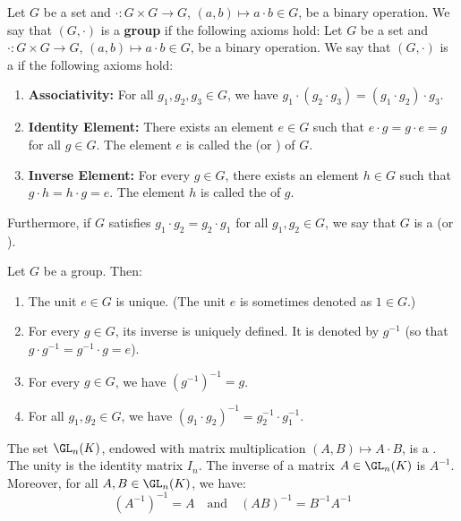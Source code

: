 \begin{definition}[Group]
Let $G$ be a set and $\cdot : G \times G \to G$, $(a,b) \mapsto a \cdot b \in G$, be a binary operation. We say that $(G, \cdot)$ is a \textbf{group} if the following axioms hold:
Let $G$ be a set and $\cdot : G \times G \to G$, $(a,b) \mapsto a \cdot b \in G$, be a binary operation. We say that $(G, \cdot)$ is a  if the following axioms hold:
\begin{enumerate}
    \item \textbf{Associativity:} For all $g_1, g_2, g_3 \in G$, we have $g_1 \cdot (g_2 \cdot g_3) = (g_1 \cdot g_2) \cdot g_3$.
    \item \textbf{Identity Element:} There exists an element $e \in G$ such that $e \cdot g = g \cdot e = g$ for all $g \in G$. The element $e$ is called the  (or ) of $G$.
    \item \textbf{Inverse Element:} For every $g \in G$, there exists an element $h \in G$ such that $g \cdot h = h \cdot g = e$. The element $h$ is called the  of $g$.
\end{enumerate}
Furthermore, if $G$ satisfies $g_1 \cdot g_2 = g_2 \cdot g_1$ for all $g_1, g_2 \in G$, we say that $G$ is a  (or ).
\end{definition}

\begin{proposition}
\label{prop:group_basic_properties}
Let $G$ be a group. Then:
\begin{enumerate}
    \item The unit $e \in G$ is unique. (The unit $e$ is sometimes denoted as $1 \in G$.)
    \item For every $g \in G$, its inverse is uniquely defined. It is denoted by $g^{-1}$ (so that $g \cdot g^{-1} = g^{-1} \cdot g = e$).
    \item For every $g \in G$, we have $(g^{-1})^{-1} = g$.
    \item For all $g_1, g_2 \in G$, we have $(g_1 \cdot g_2)^{-1} = g_2^{-1} \cdot g_1^{-1}$.
\end{enumerate}
\end{proposition}

\begin{proposition}
\label{prop:gl_group_structure}
The set $\GL_n(K)$, endowed with matrix multiplication $(A, B) \mapsto A \cdot B$, is a . The unity is the identity matrix $I_n$. The inverse of a matrix $A \in \GL_n(K)$ is $A^{-1}$. Moreover, for all $A, B \in \GL_n(K)$, we have:
\begin{equation*}
    (A^{-1})^{-1} = A \quad \text{and} \quad (AB)^{-1} = B^{-1}A^{-1}
\end{equation*}
\end{proposition}

